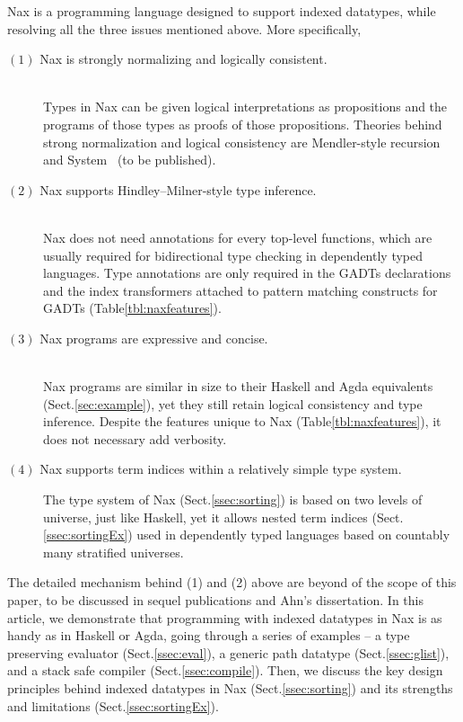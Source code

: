 Nax is a programming language designed to support indexed datatypes,
while resolving all the three issues mentioned above.
More specifically,
\begin{description}
\item[$(1)$ Nax is strongly normalizing and logically consistent.]~\\
Types in Nax can be given logical interpretations as propositions
and the programs of those types as proofs of those propositions.
Theories behind strong normalization and logical consistency are
Mendler-style recursion \cite{AhnShe11} and System \Fi\ (to be published).

\item[$(2)$ Nax supports Hindley--Milner-style type inference.]~\\
Nax does not need annotations for every top-level functions, which are usually
required for bidirectional type checking in dependently typed languages.
Type annotations are only required in the GADTs declarations and
the index transformers attached to pattern matching constructs for GADTs
(Table\;\ref{tbl:naxfeatures}).

\item[$(3)$ Nax programs are expressive and concise.]~\\
Nax programs are similar in size to their Haskell and Agda equivalents
(Sect.\;\ref{sec:example}), yet they still retain logical consistency
and type inference. Despite the features unique to Nax
(Table\;\ref{tbl:naxfeatures}), it does not necessary add verbosity.

\item[$(4)$ Nax supports term indices within a relatively simple type system.]
The type system of Nax (Sect.\;\ref{ssec:sorting}) is based on
two levels of universe, just like Haskell, yet it allows nested term indices
(Sect.\;\ref{ssec:sortingEx}) used in dependently typed languages based on
countably many stratified universes.
\end{description}
The detailed mechanism behind (1) and (2) above are beyond of the scope of
this paper, to be discussed in sequel publications and Ahn's dissertation.
In this article, we demonstrate that programming with indexed datatypes in Nax
is as handy as in Haskell or Agda, going through a series of examples --
a type preserving evaluator (Sect.\;\ref{ssec:eval}),
a generic path datatype (Sect.\;\ref{ssec:glist}), and
a stack safe compiler (Sect.\;\ref{ssec:compile}).
Then, we discuss the key design principles behind indexed datatypes in Nax
(Sect.\;\ref{ssec:sorting}) and its strengths and limitations
(Sect.\;\ref{ssec:sortingEx}).

